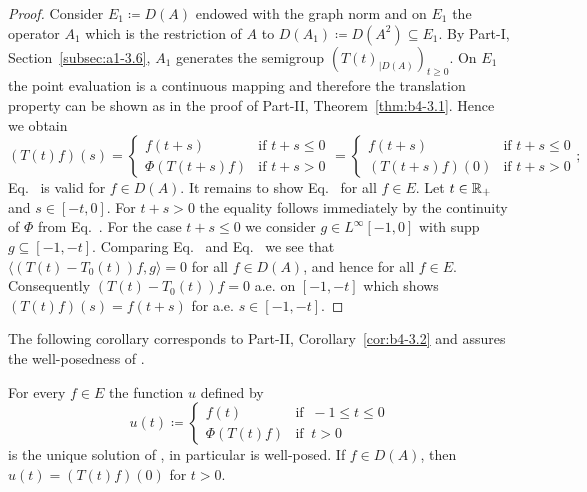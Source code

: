\begin{proof}
Consider $E_1 \coloneqq D(A)$ endowed with the graph norm 
and on $E_1$ the operator $A_1$ which is the restriction of\/ $A$ to $D(A_1) \coloneqq D(A^{2})\subseteq E_1$.
By 
Part-I, Section~\ref{subsec:a1-3.6}, $A_1$ generates the semigroup $(T(t)_{|D(A)})_{t \geq 0}$.
On $E_1$ the point evaluation is a continuous mapping and therefore the translation property can be shown as in the proof of Part-II, Theorem~\ref{thm:b4-3.1}.
Hence we obtain
\begin{equation}\label{eq:c4-3.4}
(T(t)f)(s)= \begin{cases}
    f(t+s) &\text{if } t+s \leq 0 \\
    \Phi(T(t+s)f) &\text{if } t+s > 0
\end{cases} = \begin{cases}
    f(t+s) &\text{if } t+s \leq 0 \\
    (T(t+s)f)(0) &\text{if } t+s > 0
\end{cases};
\end{equation}
\ie Eq.~ is valid for $f \in D(A)$.
It remains to show Eq.~ for all $f \in E$.
Let $t \in \mathbb{R}_+$ and $s \in [-t,0]$.
For $t + s > 0$ the equality follows immediately by the continuity of\/ $\Phi$ from Eq.~.
For the case $t + s \leq 0$ we consider $g \in L^{\infty}[-1,0]$ with supp $g \subseteq [-1,-t]$.
Comparing Eq.~ and Eq.~ we see that $\langle(T(t)-T_0(t))f,g\rangle = 0$ for all $f \in D(A)$, and hence for all $f \in E$.
Consequently $(T(t)-T_{0}(t))f = 0$ a.e. on $[-1,-t]$ which shows $(T(t)f)(s) = f(t+s)$ for a.e. $s \in [-1,-t]$.
\end{proof}
The following corollary corresponds to Part-II, Corollary~\ref{cor:b4-3.2} and assures the well-posed\-ness of .
\begin{corollary}\label{cor:c4-3.2}
%
For every $f \in E$ the function $u$ defined by
\begin{equation}\label{eq:c4-3.5}
u(t) \coloneqq  \begin{cases}
    f(t) & \text{if } \ -1 \leq t \leq 0 \\
    \Phi(T(t)f) & \text{if } \ t > 0
\end{cases}
\end{equation}
is the unique solution of , in particular  is well-posed.
If\/ $f \in D(A)$, then $u(t) = (T(t)f)(0)$ for $t > 0$.
\end{corollary}
